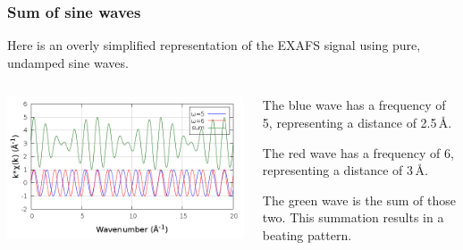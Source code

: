 \documentclass[10pt, xcolor=x11names, compress]{beamer}
\begin{document}
\begin{frame}
  \frametitle{Sum of sine waves}
  Here is an overly simplified representation of the EXAFS signal
  using pure, undamped sine waves.

  \bigskip

  \begin{columns}
    \begin{column}{0.5\linewidth}
      \includegraphics[width=\linewidth]{beat_k.png}
    \end{column}
    \begin{column}{0.5\linewidth}
      The {\color{Blue2}blue} wave has a frequency of 5, representing a
      distance of 2.5\,\AA.

      \medskip

      The {\color{Red2}red} wave has a frequency of 6, representing a
      distance of 3\,\AA.

      \medskip

      The {\color{Green4}green} wave is the sum of those two.  This
      summation results in a beating pattern.
    \end{column}
  \end{columns}
\end{frame}
\end{document}

